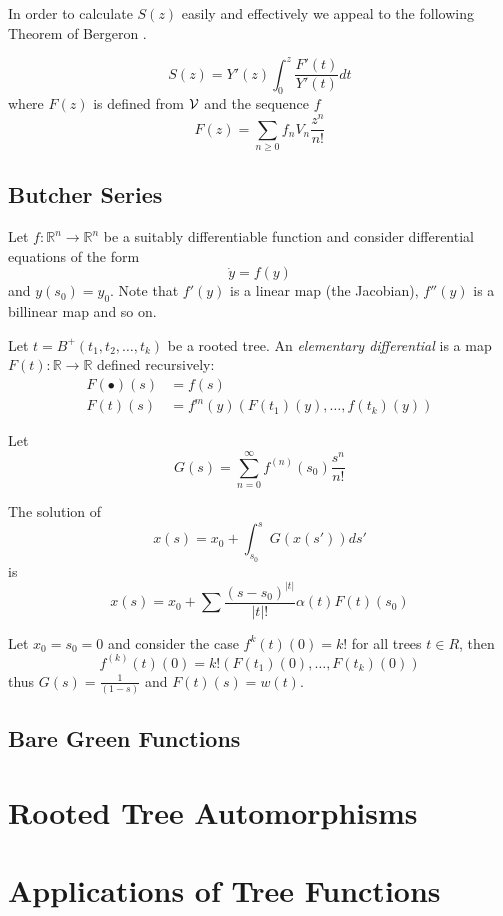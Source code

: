 In order to calculate $S(z)$ easily and effectively we appeal to the following Theorem of Bergeron \cite{Bergeron}.
\begin{thm}
 \[
 S(z) = Y'(z) \int_{0}^{z} \frac{F'(t)}{Y'(t)} dt
 \]
where $F(z)$ is defined from $\operatorname{\mathcal{V}}$ and the sequence $f$
\[
 F(z) = \sum_{n \geq 0} f_n V_n \frac{z^n}{n!}
\]
\end{thm}

 \subsection{Butcher Series}
 Let $f: \mathbb{R}^n \rightarrow \mathbb{R}^n$ be a suitably differentiable function and consider differential equations of the form 
 \[
  \dot{y} = f(y)
 \]
and $y(s_0) = y_0$.  Note that $f'(y)$ is a linear map (the Jacobian), $f''(y)$ is a billinear map and so on.  

\begin{defn}
Let $t = B^{+}(t_1,t_2,\dots,t_k)$ be  a rooted tree. An \emph{elementary differential} is a map  $F(t):  \mathbb{R} \rightarrow \mathbb{R}$ defined 
recursively:
\begin{align}
 F(\bullet)(s) &= f(s) \\%
 F(t)(s) &= f^{m}(y)(F(t_1)(y),\dots,f(t_k)(y))
 \end{align}
\end{defn}
Let
\[
 G(s) = \sum_{n=0}^{\infty}f^{(n)}(s_0) \frac{s^n}{n!}
\]
\begin{theorem}
 The solution of 
 \[
  x(s) = x_0 + \int_{s_0}^{s} G(x(s')) ds'
 \]
is
\[
 x(s) = x_0 + \sum \frac{(s-s_0)^{\lvert t \rvert}}{\lvert t \rvert !}\alpha(t)F(t)(s_0)
\]
\end{theorem}
\begin{ex}
 Let $x_0 = s_0 = 0$  and consider the case $f^{k}(t)(0) = k!$ for all trees $t \in R$, then 
 \[
 f^{(k)}(t)(0) = k!(F(t_1)(0),\dots,F(t_k)(0))
 \]
 thus $G(s) = \frac{1}{(1-s)}$ and $F(t)(s) = w(t)$.  
 
\end{ex}


\subsection{Bare Green Functions}

\section{Rooted Tree Automorphisms}



\section{Applications of Tree Functions}



